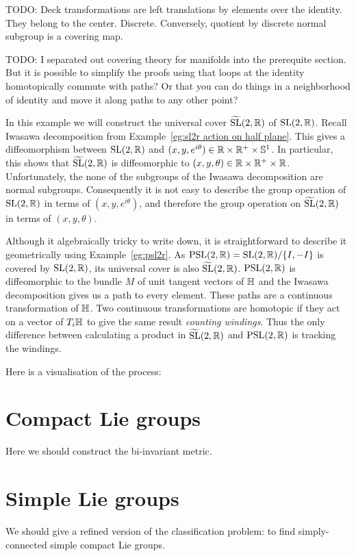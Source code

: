 TODO: Deck transformations are left translations by elements over the identity. They belong to the center. Discrete. Conversely, quotient by discrete normal subgroup is a covering map.

TODO: I separated out covering theory for manifolds into the prerequite section. But it is possible to simplify the proofs using that loops at the identity homotopically commute with paths? Or that you can do things in a neighborhood of identity and move it along paths to any other point?


\begin{example}
In this example we will construct the universal cover $\widetilde{\mathrm{SL}}(2,\mathbb{R})$ of $\mathrm{SL}(2,\mathbb{R})$.
Recall Iwasawa decomposition from Example~\ref{eg:sl2r action on half plane}.
This gives a diffeomorphism between $\mathrm{SL}(2,\mathbb{R})$ and $(x,y,e^{i\theta}) \in \mathbb{R} \times \mathbb{R}^+ \times \mathbb{S}^1$.
In particular, this shows that $\widetilde{\mathrm{SL}}(2,\mathbb{R})$ is diffeomorphic to $(x,y,\theta) \in \mathbb{R} \times \mathbb{R}^+ \times \mathbb{R}$.
Unfortunately, the none of the subgroups of the Iwasawa decomposition are normal subgroups.
Consequently it is not easy to describe the group operation of $\mathrm{SL}(2,\mathbb{R})$ in terms of $(x,y,e^{i\theta})$, and therefore the group operation on $\widetilde{\mathrm{SL}}(2,\mathbb{R})$ in terms of $(x,y,\theta)$.

Although it algebraically tricky to write down, it is straightforward to describe it geometrically using Example~\ref{eg:psl2r}.
As $\mathrm{PSL}(2,\mathbb{R}) = \mathrm{SL}(2,\mathbb{R})/\{I,-I\}$ is covered by $\mathrm{SL}(2,\mathbb{R})$, its universal cover is also $\widetilde{\mathrm{SL}}(2,\mathbb{R})$.
$\mathrm{PSL}(2,\mathbb{R})$ is diffeomorphic to the bundle $M$ of unit tangent vectors of $\mathbb{H}$ and the Iwasawa decomposition gives us a path to every element.
These paths are a continuous transformation of $\mathbb{H}$.
Two continuous transformations are homotopic if they act on a vector of $T_i\mathbb{H}$ to give the same result \emph{counting windings}.
Thus the only difference between calculating a product in $\widetilde{\mathrm{SL}}(2,\mathbb{R})$ and $\mathrm{PSL}(2,\mathbb{R})$ is tracking the windings.
\begin{webonly}
Here is a visualisation of the process:
\end{webonly}
\end{example}



\section{Compact Lie groups}

Here we should construct the bi-invariant metric.


\section{Simple Lie groups}
We should give a refined version of the classification problem: to find simply-connected simple compact Lie groups.
